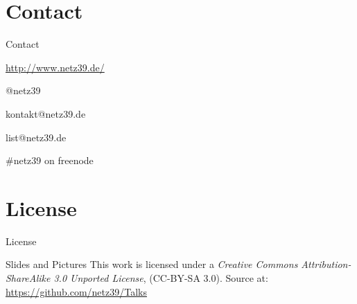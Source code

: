 \documentclass{beamer}
\begin{document}
\section{Contact}

\begin{frame}{Contact}
    \begin{center}
        \begin{description}
            \item[WWW] \url{http://www.netz39.de/}
            \item[Twitter/identi.ca] @netz39
            \item[E-Mail] kontakt@netz39.de
            \item[Mailingliste] list@netz39.de
            \item[IRC] \#netz39 on freenode
        \end{description}
    \end{center}
\end{frame}

\appendix

\section{License}

\begin{frame}{License}
    \begin{block}{Slides and Pictures}
        This work is licensed under a \emph{Creative Commons
        Attribution-ShareAlike 3.0 Unported License}, (CC-BY-SA 3.0).
        Source at: \url{https://github.com/netz39/Talks}
    \end{block}
\end{frame}
\end{document}
